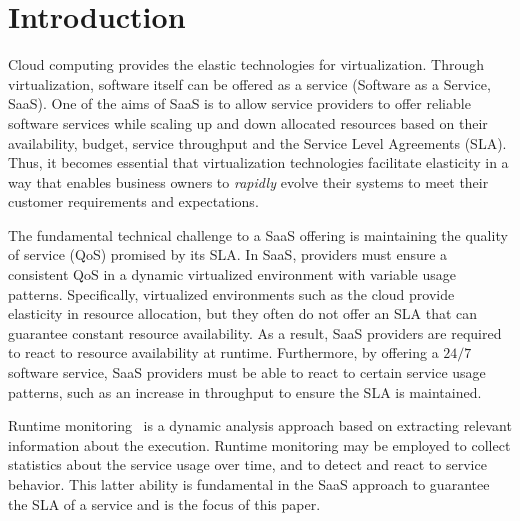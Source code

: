 
\section{Introduction}
\label{ch04:sec:introduction}

Cloud computing provides the elastic technologies for virtualization. 
Through virtualization, software itself can be offered as a service (Software as a Service,
SaaS). 
One of the aims of SaaS is to allow service providers to offer reliable software services while scaling up and down allocated resources based on their availability, budget, service throughput and the Service Level Agreements (SLA).
Thus, it becomes essential that virtualization technologies facilitate elasticity in a way that enables business owners to \emph{rapidly} evolve their systems to meet their customer requirements and expectations.

The fundamental technical challenge to a SaaS offering is maintaining the quality
of service (QoS) promised by its SLA. In SaaS, providers must
ensure a consistent QoS in a dynamic virtualized environment with variable
usage patterns. Specifically, virtualized environments such as the cloud
provide elasticity in resource allocation, but they often do not offer an SLA that can
guarantee constant resource availability. As a result, SaaS providers are
required to react to resource availability at runtime. Furthermore, by offering a
$24/7$ software service, SaaS providers must be able to react to certain service
usage patterns, such as an increase in throughput to ensure the SLA is
maintained.

Runtime monitoring~\cite{Logean_monitoring,BratanisDS10} is a dynamic analysis approach
based on
extracting relevant information about the execution.
Runtime monitoring may be employed to collect statistics about the service usage over time, and to detect and react to service behavior. 
This latter ability is fundamental in the SaaS approach to guarantee the SLA of a service
and is the focus of this paper.

